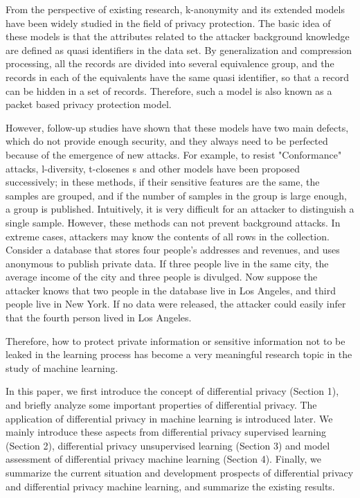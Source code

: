 \documentclass[10pt,conference]{IEEEtran}
\begin{document}
From the perspective of existing research, k-anonymity\cite{Sweeney2012} and its extended models have been widely studied in the field of privacy protection. The basic idea of these models is that the attributes related to the attacker background knowledge are defined as quasi identifiers in the data set. By generalization and compression processing, all the records are divided into several equivalence group, and the records in each of the equivalents have the same quasi identifier, so that a record can be hidden in a set of records. Therefore, such a model is also known as a packet based privacy protection model.

However, follow-up studies have shown that these models have two main defects, which do not provide enough security, and they always need to be perfected because of the emergence of new attacks. For example, to resist "Conformance" attacks, l-diversity\cite{Machanavajjhala2006L}, t-closenes s\cite{Li2007t} and other models have been proposed successively; in these methods, if their sensitive features are the same, the samples are grouped, and if the number of samples in the group is large enough, a group is published. Intuitively, it is very difficult for an attacker to distinguish a single sample. However, these methods can not prevent background attacks. In extreme cases, attackers may know the contents of all rows in the collection. Consider a database that stores four people's addresses and revenues, and uses anonymous to publish private data. If three people live in the same city, the average income of the city and three people is divulged. Now suppose the attacker knows that two people in the database live in Los Angeles, and third people live in New York. If no data were released, the attacker could easily infer that the fourth person lived in Los Angeles.

Therefore, how to protect private information or sensitive information not to be leaked in the learning process has become a very meaningful research topic in the study of machine learning.

In this paper, we first introduce the concept of differential privacy (Section 1), and briefly analyze some important properties of differential privacy. The application of differential privacy in machine learning is introduced later. We mainly introduce these aspects from differential privacy supervised learning (Section 2), differential privacy unsupervised learning (Section 3) and model assessment of differential privacy machine learning (Section 4). Finally, we summarize the current situation and development prospects of differential privacy and differential privacy machine learning, and summarize the existing results.
\end{document}
